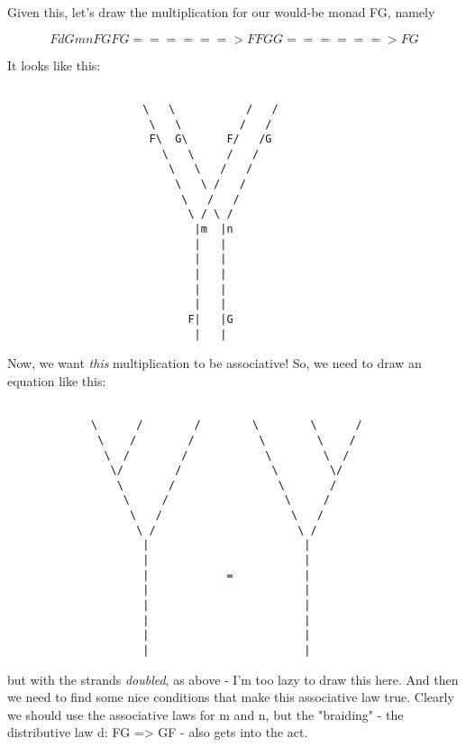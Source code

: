Given this, let's draw the multiplication for our would-be
monad FG, namely 


$$

       FdG          mn 
FGFG ======> FFGG ======> FG
$$
    
It looks like this:


\begin{verbatim}

                     \   \           /   /
                      \   \         /   /
                      F\  G\      F/   /G
                        \   \     /   /
                         \   \   /   /
                          \   \ /   /
                           \   /   /
                            \ / \ /
                             |m  |n             
                             |   |
                             |   |
                             |   |
                             |   |
                             |   |
                            F|   |G
                             |   |
\end{verbatim}
    
Now, we want \emph{this} multiplication to be associative!  So, 
we need to draw an equation like this:


\begin{verbatim}

             \      /        /        \        \      /
              \    /        /          \        \    /
               \  /        /            \        \  /
                \/        /              \        \/
                 \       /                \       / 
                  \     /                  \     /
                   \   /                    \   /
                    \ /                      \ /
                     |                        |
                     |                        |
                     |            =           |
                     |                        |
                     |                        |
                     |                        |
                     |                        |
                     |                        | 
\end{verbatim}
    
but with the strands \emph{doubled}, as above - I'm too lazy
to draw this here.  And then we need to find some nice conditions
that make this associative law true.  Clearly we should use the
associative laws for m and n, but the "braiding" - the distributive
law d: FG => GF - also gets into the act.

